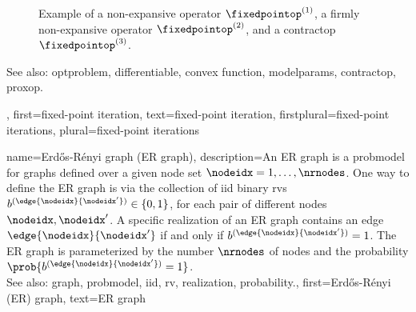{{\begin{figure}[H]
\begin{center}
			\end{center} 
			\caption{Example of a non-expansive operator $\fixedpointop^{(1)}$, a firmly non-expansive operator $\fixedpointop^{(2)}$, and 
				a \gls{contractop} $\fixedpointop^{(3)}$. \label{fig_examples_nonexp_dict}}
		\end{figure} 
		See also: \gls{optproblem}, \gls{differentiable}, \gls{convex} \gls{function}, \glspl{modelparam}, \gls{contractop}, \gls{proxop}.},
	first={fixed-point iteration},
	text={fixed-point iteration},
	firstplural={fixed-point iterations}, 
	plural={fixed-point iterations}
}


{name={Erd\H{o}s-R\'enyi graph (ER graph)},
	description={An ER  \gls{graph} is a \gls{probmodel} for \glspl{graph} defined over 
		a given node set $\nodeidx=1, \ldots, \nrnodes$. One way to define the ER \gls{graph} is 
		via the collection of \gls{iid} binary \glspl{rv} $b^{(\edge{\nodeidx}{\nodeidx'})} \in \{0,1\}$, 
		for each pair of different nodes $\nodeidx, \nodeidx'$. A specific \gls{realization}  
		of an ER \gls{graph} contains an edge $\edge{\nodeidx}{\nodeidx'}$ if and only if 
		$b^{(\edge{\nodeidx}{\nodeidx'})}=1$. The ER \gls{graph} is parameterized by the 
		number $\nrnodes$ of nodes and the \gls{probability} $\prob{b^{(\edge{\nodeidx}{\nodeidx'})}=1}$. 
		\\
		See also: \gls{graph}, \gls{probmodel}, \gls{iid}, \gls{rv}, \gls{realization}, \gls{probability}.},
	first={Erd\H{o}s-R\'enyi (ER) graph},
	text={ER graph}
}


